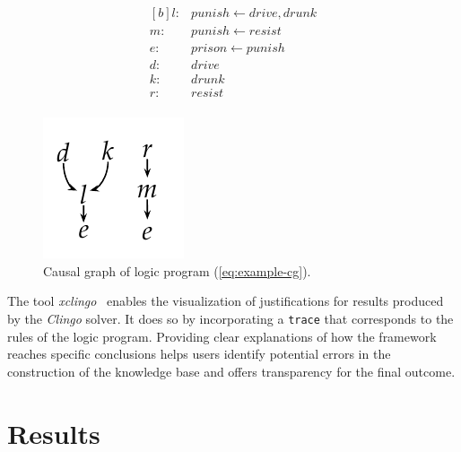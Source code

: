 \documentclass[11pt,leqno]{amsart}
\newcommand{\src}[1]{\texttt{#1}}
\begin{document}
\begin{figure}[t]
    \centering
    \begin{minipage}{0.48\textwidth}
    \begin{equation}
    \begin{aligned}[b]
        l :& punish \longleftarrow drive, drunk \\
        m :& punish \longleftarrow resist \\
        e :& prison \longleftarrow punish \\
        d :& drive \\
        k :& drunk \\
        r :& resist \\
    \end{aligned}
    \label{eq:example-cg}
    \end{equation}
    \end{minipage}
    \hfill
    \begin{minipage}{0.45\textwidth}
    \centering
    \includegraphics[width=.5\textwidth]{assets/causal_g.pdf}
    \caption{Causal graph of logic program (\cref{eq:example-cg}).}
    \label{fig:causal-g}
    \end{minipage}
\end{figure}
    

The tool \textit{xclingo}~\cite{Cabalar_2020} 
enables the visualization of justifications for results produced by the \textit{Clingo} solver. 
It does so by incorporating a \src{trace} that corresponds to the rules of the logic program. 
Providing clear explanations of how the framework reaches specific conclusions helps users identify 
potential errors in the construction of the knowledge base and offers transparency for the final outcome. 

\section{Results}\label{sec:results}
\end{document}
